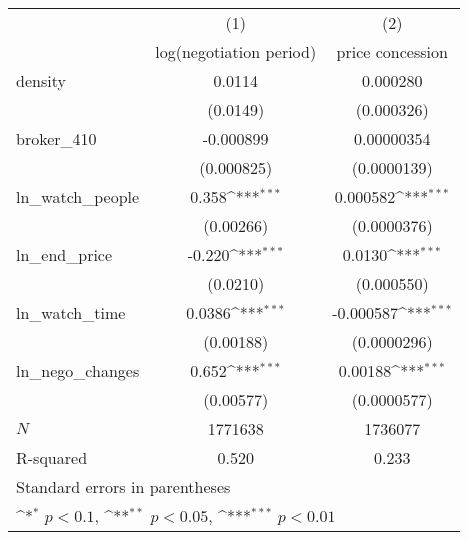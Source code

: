 {
\def\sym#1{\ifmmode^{#1}\else\(^{#1}\)\fi}
\begin{tabular}{l*{2}{c}}
\toprule
            &\multicolumn{1}{c}{(1)}&\multicolumn{1}{c}{(2)}\\
            &\multicolumn{1}{c}{log(negotiation period)}&\multicolumn{1}{c}{price concession}\\
\midrule
density     &      0.0114         &    0.000280         \\
            &    (0.0149)         &  (0.000326)         \\
\addlinespace
broker\_410  &   -0.000899         &  0.00000354         \\
            &  (0.000825)         & (0.0000139)         \\
\addlinespace
ln\_watch\_people&       0.358\sym{***}&    0.000582\sym{***}\\
            &   (0.00266)         & (0.0000376)         \\
\addlinespace
ln\_end\_price&      -0.220\sym{***}&      0.0130\sym{***}\\
            &    (0.0210)         &  (0.000550)         \\
\addlinespace
ln\_watch\_time&      0.0386\sym{***}&   -0.000587\sym{***}\\
            &   (0.00188)         & (0.0000296)         \\
\addlinespace
ln\_nego\_changes&       0.652\sym{***}&     0.00188\sym{***}\\
            &   (0.00577)         & (0.0000577)         \\
\midrule
\(N\)       &     1771638         &     1736077         \\
R-squared   &       0.520         &       0.233         \\
\bottomrule
\multicolumn{3}{l}{\footnotesize Standard errors in parentheses}\\
\multicolumn{3}{l}{\footnotesize \sym{*} \(p<0.1\), \sym{**} \(p<0.05\), \sym{***} \(p<0.01\)}\\
\end{tabular}
}
